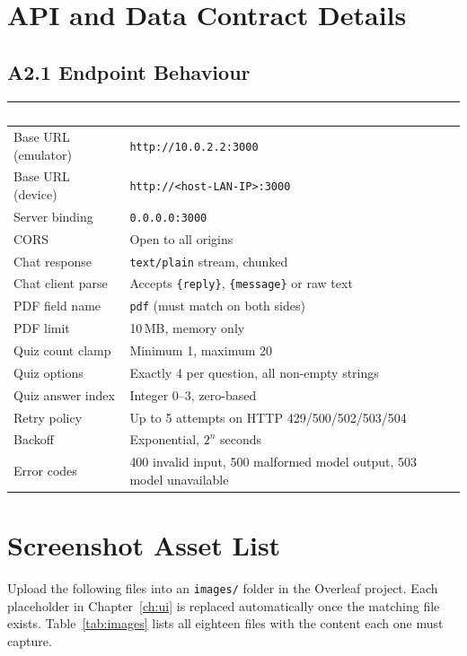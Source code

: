 \documentclass[12pt,a4paper,oneside]{report}
\begin{document}
\chapter{API and Data Contract Details}

\section*{A2.1 Endpoint Behaviour}

\begin{table}[H]
\centering
\small
\begin{tabularx}{\textwidth}{@{}p{3.0cm}X@{}}
\toprule
\rowcolor{tblhead} \textcolor{white}{\textbf{Aspect}} &
\textcolor{white}{\textbf{Detail}} \\
\midrule
Base URL (emulator) & \texttt{http://10.0.2.2:3000} \\
Base URL (device)   & \texttt{http://<host-LAN-IP>:3000} \\
Server binding      & \texttt{0.0.0.0:3000} \\
CORS                & Open to all origins \\
Chat response       & \texttt{text/plain} stream, chunked \\
Chat client parse   & Accepts \texttt{\{reply\}}, \texttt{\{message\}} or raw text \\
PDF field name      & \texttt{pdf} (must match on both sides) \\
PDF limit           & 10\,MB, memory only \\
Quiz count clamp    & Minimum 1, maximum 20 \\
Quiz options        & Exactly 4 per question, all non-empty strings \\
Quiz answer index   & Integer 0--3, zero-based \\
Retry policy        & Up to 5 attempts on HTTP 429/500/502/503/504 \\
Backoff             & Exponential, $2^{n}$ seconds \\
Error codes         & 400 invalid input, 500 malformed model output, 503 model unavailable \\
\bottomrule
\end{tabularx}
\end{table}

\chapter{Screenshot Asset List}

Upload the following files into an \texttt{images/} folder in the Overleaf project.
Each placeholder in Chapter~\ref{ch:ui} is replaced automatically once the matching
file exists. Table~\ref{tab:images} lists all eighteen files with the content each one
must capture.
\end{document}
